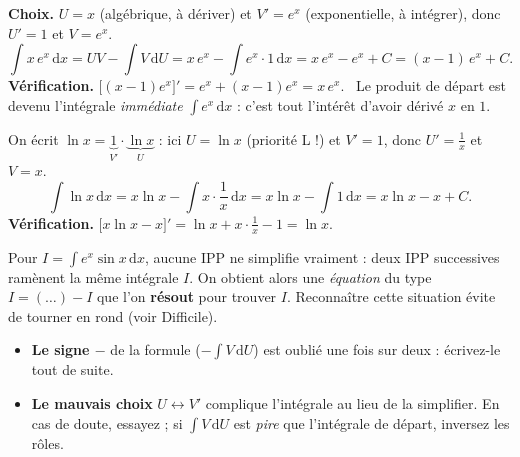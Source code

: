 \documentclass[11pt,a4paper]{article}
\newcommand{\dd}{\mathrm{d}}
\begin{document}
\begin{exemple}[le cas d'école : $\displaystyle\int x\,e^x\,\dd x$]
\textbf{Choix.} $U=x$ (algébrique, à dériver) et $V'=e^x$ (exponentielle, à intégrer), donc $U'=1$ et $V=e^x$.
\[
\int x\,e^x\,\dd x=U V-\int V\,\dd U=x\,e^x-\int e^x\cdot 1\,\dd x=x\,e^x-e^x+C=\boxed{(x-1)\,e^x+C.}
\]
\textbf{Vérification.} $\bigl[(x-1)e^x\bigr]'=e^x+(x-1)e^x=x\,e^x$. \checkmark\ Le produit de départ est devenu
l'intégrale \emph{immédiate} $\int e^x\,\dd x$ : c'est tout l'intérêt d'avoir dérivé $x$ en $1$.
\end{exemple}

\begin{exemple}
On écrit $\ln x=\underbrace{1}_{V'}\cdot\underbrace{\ln x}_{U}$ : ici $U=\ln x$ (priorité L !) et $V'=1$, donc
$U'=\tfrac1x$ et $V=x$.
\[
\int \ln x\,\dd x=x\ln x-\int x\cdot\frac1x\,\dd x=x\ln x-\int 1\,\dd x=\boxed{x\ln x-x+C.}
\]
\textbf{Vérification.} $\bigl[x\ln x-x\bigr]'=\ln x+x\cdot\tfrac1x-1=\ln x$. \checkmark
\end{exemple}

\begin{remarque}
Pour $\displaystyle I=\int e^x\sin x\,\dd x$, aucune IPP ne simplifie vraiment : deux IPP successives
ramènent la même intégrale $I$. On obtient alors une \emph{équation} du type $I=(\ldots)-I$ que l'on
\textbf{résout} pour trouver $I$. Reconnaître cette situation évite de tourner en rond (voir Difficile).
\end{remarque}

\begin{attention}
\begin{itemize}[leftmargin=1.5em,topsep=1pt,itemsep=1pt]
  \item \textbf{Le signe $-$} de la formule ($-\int V\,\dd U$) est oublié une fois sur deux : écrivez-le tout de suite.
  \item \textbf{Le mauvais choix} $U\leftrightarrow V'$ complique l'intégrale au lieu de la simplifier. En cas de doute,
        essayez ; si $\int V\,\dd U$ est \emph{pire} que l'intégrale de départ, inversez les rôles.
\end{itemize}
\end{attention}
\end{document}
